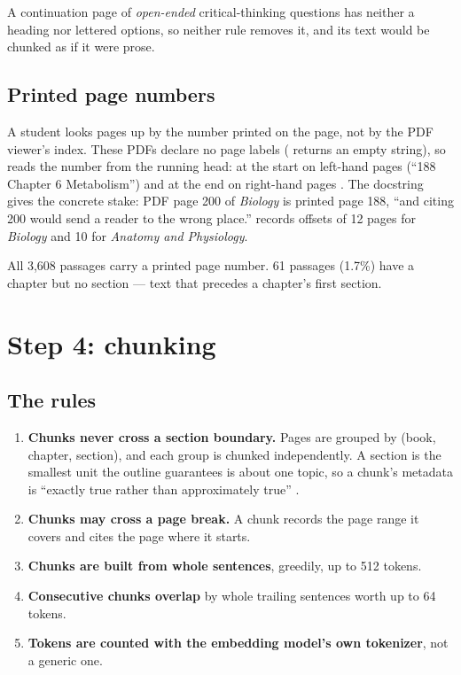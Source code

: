 \begin{inferred}
A continuation page of \emph{open-ended} critical-thinking questions has neither a heading nor lettered options, so neither rule removes it, and its text would be chunked as if it were prose.
\end{inferred}

\subsection{Printed page numbers}

A student looks pages up by the number printed on the page, not by the PDF viewer's index. These PDFs declare no page labels ( returns an empty string), so  reads the number from the running head: at the start on left-hand pages (\enquote{188 Chapter 6 \textbar{} Metabolism}) and at the end on right-hand pages . The docstring gives the concrete stake: PDF page 200 of \emph{Biology} is printed page 188, \enquote{and citing 200 would send a reader to the wrong place.}  records offsets of 12 pages for \emph{Biology} and 10 for \emph{Anatomy and Physiology}.

\begin{measured}
All 3,608 passages carry a printed page number. 61 passages (1.7\%) have a chapter but no section --- text that precedes a chapter's first section.
\end{measured}

\section{Step 4: chunking}
\label{sec:chunking}

\subsection{The rules}

\begin{enumerate}
  \item \textbf{Chunks never cross a section boundary.} Pages are grouped by (book, chapter, section), and each group is chunked independently. A section is the smallest unit the outline guarantees is about one topic, so a chunk's metadata is \enquote{exactly true rather than approximately true} .
  \item \textbf{Chunks may cross a page break.} A chunk records the page range it covers and cites the page where it starts.
  \item \textbf{Chunks are built from whole sentences}, greedily, up to 512 tokens.
  \item \textbf{Consecutive chunks overlap} by whole trailing sentences worth up to 64 tokens.
  \item \textbf{Tokens are counted with the embedding model's own tokenizer}, not a generic one.
\end{enumerate}

